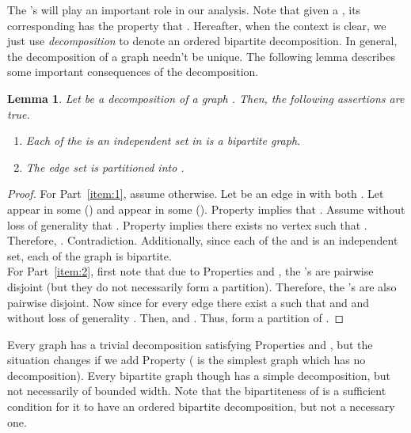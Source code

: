 \documentclass[11pt]{article}
\newtheorem{lemma}[theorem]{Lemma}
\begin{document}
The 's will play an important role in our analysis. Note that given a , its corresponding  has the property that . Hereafter, when the context is clear, we just use {\em decomposition} to denote an ordered bipartite decomposition. In general, the decomposition of a graph needn't be unique. The following lemma describes some important consequences of the decomposition. 
\begin{lemma} \label{com}
Let  be a decomposition of a graph . Then,  the following assertions are true. 
\begin{enumerate}
\item \label{item:1} Each of the  is an independent set in   is a bipartite graph. 
\item \label{item:2} The edge set  is partitioned into .
\end{enumerate}
\end{lemma}
\begin{proof}
For Part~\ref{item:1}, assume otherwise. Let  be an edge in  with both . Let  appear in some  () and  appear in some  (). Property  implies that . Assume without loss of generality that . Property   implies there exists no vertex  such that . Therefore, . Contradiction. Additionally, since each of the  and  is an independent set, each of the graph  is bipartite.\\
For Part~\ref{item:2}, first note that due to Properties  and , the 's are pairwise disjoint (but they do not necessarily form a partition). Therefore, the 's are also pairwise disjoint. Now since for every edge  there exist a  such that   and  and without loss of generality . Then,  and . Thus,  form a partition of .  
\end{proof}


Every graph has a trivial decomposition satisfying Properties  and , but the situation changes if we add Property  ( is the simplest graph which has no decomposition). Every bipartite graph though has a simple decomposition, but not necessarily of bounded width. Note that the bipartiteness of  is a sufficient condition for it to have an ordered bipartite decomposition, but not a necessary one.
\end{document}
